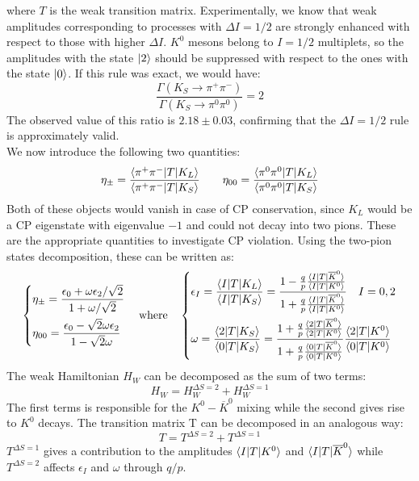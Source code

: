 \documentclass[../main.tex]{subfiles}
\begin{document}
where $T$ is the weak transition matrix. Experimentally, we know that weak amplitudes corresponding to processes with $\Delta I=1/2$ are strongly enhanced with respect to those with higher $\Delta I$. $K^0$ mesons belong to $I=1/2$ multiplets, so the amplitudes with the state $\ket{2}$ should be suppressed with respect to the ones with the state $\ket{0}$. If this rule was exact, we would have:
\[
\frac{\Gamma(K_S\to\pi^+\pi^-)}{\Gamma(K_S\to\pi^0\pi^0)}=2
\]
The observed value of this ratio is $2.18\pm0.03$, confirming that the $\Delta I=1/2$ rule is approximately valid.\\ 
We now introduce the following two quantities:
\[
\eta_\pm=\frac{\braket{\pi^+\pi^-|T|K_L}}{\braket{\pi^+\pi^-|T|K_S}} \qquad \eta_{00}=\frac{\braket{\pi^0\pi^0|T|K_L}}{\braket{\pi^0\pi^0|T|K_S}}
\]
Both of these objects would vanish in case of CP conservation, since $K_L$ would be a CP eigenstate with eigenvalue $-1$ and could not decay into two pions. These are the appropriate quantities to investigate CP violation. Using the two-pion states decomposition, these can be written as:
\[
\left\{
\begin{aligned}
&\eta_\pm=\frac{\epsilon_0+\omega\epsilon_2/\sqrt{2}}{1+\omega/\sqrt{2}}\\
&\eta_{00}=\frac{\epsilon_0-\sqrt{2}\omega\epsilon_2}{1-\sqrt{2}\omega}
\end{aligned}
\right.
\quad\text{where}\quad
\left\{
\begin{aligned}
&\epsilon_I=\frac{\braket{I|T|K_L}}{\braket{I|T|K_S}}=\frac{1-\frac{q}{p}\frac{\braket{I|T|\overline{K}^0}}{\braket{I|T|K^0}}}{1+\frac{q}{p}\frac{\braket{I|T|\overline{K}^0}}{\braket{I|T|K^0}}} \quad I=0,2\\
&\omega=\frac{\braket{2|T|K_S}}{\braket{0|T|K_S}}=\frac{1+\frac{q}{p}\frac{\braket{2|T|\overline{K}^0}}{\braket{2|T|K^0}}}{1+\frac{q}{p}\frac{\braket{0|T|\overline{K}^0}}{\braket{0|T|K^0}}}\frac{\braket{2|T|K^0}}{\braket{0|T|K^0}}
\end{aligned}
\right.
\]
The weak Hamiltonian $H_W$ can be decomposed as the sum of two terms:
\[
H_W=H_W^{\Delta S=2}+H_W^{\Delta S=1}
\]
The first terms is responsible for the $K^0-\overline{K}^0$ mixing while the second gives rise to $K^0$ decays. The transition matrix T can be decomposed in an analogous way:
\[
T=T^{\Delta S=2}+T^{\Delta S=1}
\]
$T^{\Delta S=1}$ gives a contribution to the amplitudes $\braket{I|T|K^0}$ and $\braket{I|T|\overline{K}^0}$ while $T^{\Delta S=2}$ affects $\epsilon_I$ and $\omega$ through $q/p$.\\
\end{document}
